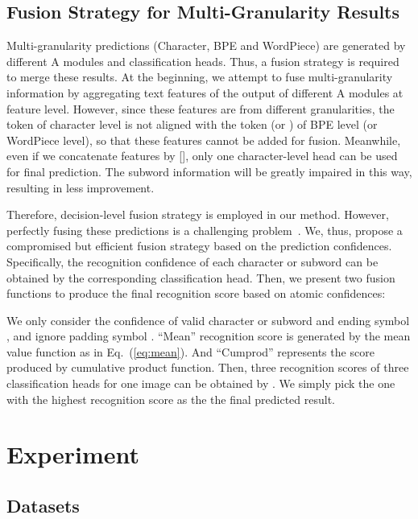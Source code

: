 \documentclass[runningheads]{llncs}
\begin{document}
\subsection{Fusion Strategy for Multi-Granularity Results }
\label{sec:fuse}
Multi-granularity predictions (Character, BPE and WordPiece) are generated by different A modules and classification heads. Thus, a fusion strategy is required to merge these results. At the beginning, we attempt to fuse multi-granularity information by aggregating text features   of the output of different A modules at feature level. However, since these features are from different granularities, the   token  of character level is not aligned with the  token  (or ) of BPE level (or WordPiece level), so that these features cannot be added for fusion. Meanwhile, even if we concatenate features by [], only one character-level head can be used for final prediction. The subword information will be greatly impaired in this way, resulting in less improvement.

Therefore, decision-level fusion strategy is employed in our method. However, perfectly fusing these predictions is a challenging problem~\cite{rrlrgu}.
We, thus, propose a compromised but efficient fusion strategy based on the prediction confidences.
Specifically, the recognition confidence of each character or subword can be obtained by the corresponding classification head.
Then, we present two fusion functions  to produce the final recognition score based on atomic confidences:


We only consider the confidence of valid character or subword and ending symbol , and ignore padding symbol .
``Mean'' recognition score is generated by the mean value function as in Eq.~(\ref{eq:mean}). 
And ``Cumprod'' represents the score produced by cumulative product function.
Then, three recognition scores of three classification heads for one image can be obtained by .
We simply pick the one with the highest recognition score as the the final predicted result.


\section{Experiment}
\label{Sec:Experiment}
\subsection{ Datasets}
\end{document}
